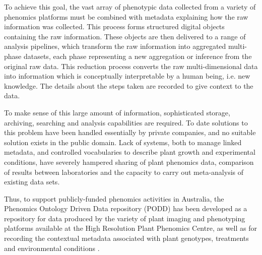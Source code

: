 \documentclass{llncs}
\begin{document}
To achieve this goal, the vast array of phenotypic data collected from a variety
of phenomics platforms must be combined with metadata explaining how the raw
information was collected. This process forms structured digital objects
containing the raw information. These objects are then delivered to a range of
analysis pipelines, which transform the raw information into  aggregated
multi-phase datasets, each phase representing a new aggregation or inference
from the original raw data. This reduction process converts the raw
multi-dimensional data into information which is conceptually interpretable by a
human being, i.e. new knowledge. The details about the steps taken are recorded
to give context to the data. 


To make sense of this large amount of information, sophisticated storage,
archiving, searching and analysis capabilities are required. To date solutions
to this problem have been handled essentially by private companies, and no
suitable solution exists in the public domain. Lack of systems, both to manage
linked metadata, and controlled vocabularies to describe plant growth and
experimental conditions, have severely hampered sharing of plant phenomics data,
comparison of results between laboratories and the capacity to carry out
meta-analysis of existing data sets.


Thus, to support publicly-funded phenomics activities in Australia, the
Phenomics Ontology Driven Data repository (PODD) has been developed as a
repository for data produced by the variety of plant imaging and phenotyping
platforms available at the High Resolution Plant Phenomics Centre, as well as
for recording the contextual metadata associated with plant genotypes,
treatments and environmental conditions \cite{Li2010}. 
\end{document}
